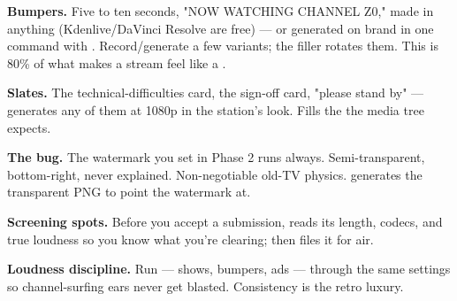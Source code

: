 \documentclass[fontpath=fonts/,logopath=logo/]{riposte-doc}
\begin{document}
\textbf{Bumpers.} Five to ten seconds, "NOW WATCHING CHANNEL Z0," made in anything (Kdenlive/DaVinci Resolve are free) — or generated on brand in one command with . Record/generate a few variants; the  filler rotates them. This is 80\% of what makes a stream feel like a .

\textbf{Slates.} The technical-difficulties card, the sign-off card, "please stand by" —  generates any of them at 1080p in the station's look. Fills the  the media tree expects.

\textbf{The bug.} The watermark you set in Phase 2 runs always. Semi-transparent, bottom-right, never explained. Non-negotiable old-TV physics.  generates the transparent PNG to point the watermark at.

\textbf{Screening spots.} Before you accept a submission,  reads its length, codecs, and true loudness so you know what you're clearing;  then files it for air.

\textbf{Loudness discipline.} Run  — shows, bumpers, ads — through the same  settings so channel-surfing ears never get blasted. Consistency is the retro luxury.


\end{document}
